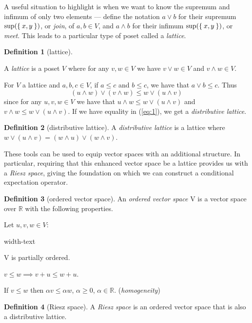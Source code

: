 \documentclass[letterpaper,10pt,oneside,onecolumn,reqno]{amsart}
\newcommand{\R}{\mathbb R}
\theoremstyle{definition}
\newtheorem{defn}{Definition}
\newcommand{\meet}{\wedge}
\newcommand{\join}{\vee}
\begin{document}
A useful situation to highlight is when we want to know the supremum
and infimum of only two elements --- define the notation $a \join b$
for their supremum $\sup(\Set{x,y})$, or \emph{join}, of $a,b \in V$,
and $a \meet b$ for their infimum $\sup(\Set{x,y})$, or
\emph{meet}. This leads to a particular type of poset called a
\emph{lattice}.


\begin{framed}
  \begin{defn}[lattice]\label{def:3}

    A \emph{lattice} is a poset $V$ where for any $v,w
    \in V$ we have $v \join w \in V$ and $v \meet w \in V$.

  \end{defn}
\end{framed}

For $V$ a lattice and $a,b,c \in V$, if $a \leq c $ and $b \leq c $,
we have that $a \join b \leq c $. Thus
\begin{equation}
  \label{eq:1}
  (u \meet w) \join (v \meet w) \leq w \join (u \meet v)
\end{equation}
since for any $u,v,w \in V$ we have that $u \meet w \leq w \join (u
\meet v)$ and $v \meet w \leq w \join (u \meet v)$. If we have
equality in (\ref{eq:1}), we get a \emph{distributive lattice}.


\begin{framed}
  \begin{defn}[distributive lattice]\label{def:4} %
    A \emph{distributive lattice} is a
    lattice where $w \join (u \meet v) = (w \meet u) \join (w \meet
    v)$.
  \end{defn}
\end{framed}

These tools can be used to equip vector spaces with an additional
structure. In particular, requiring that this enhanced vector space be
a lattice provides us with a \emph{Riesz space}, giving the foundation
on which we can construct a conditional expectation operator.

\begin{framed}
  \begin{defn}[ordered vector space]\label{def:5}
    An \emph{ordered vector space} V is a
    vector space over $\R$ with the following properties.

    Let $u,v,w \in V$:
    \begin{deflist}{width-text}
    \item V is partially ordered.
    \item $v \leq w \implies v + u \leq w + u$.
    \item If $v \leq w$ then $\alpha v \leq \alpha w$, $\alpha \geq
      0$, $\alpha \in \R$. (\emph{homogeneity})
    \end{deflist}
  \end{defn}

\begin{defn}[Riesz space]\label{def:6}
  A \emph{Riesz space} is an ordered vector space
  that is also a distributive lattice.
\end{defn}
\end{framed}
\end{document}
